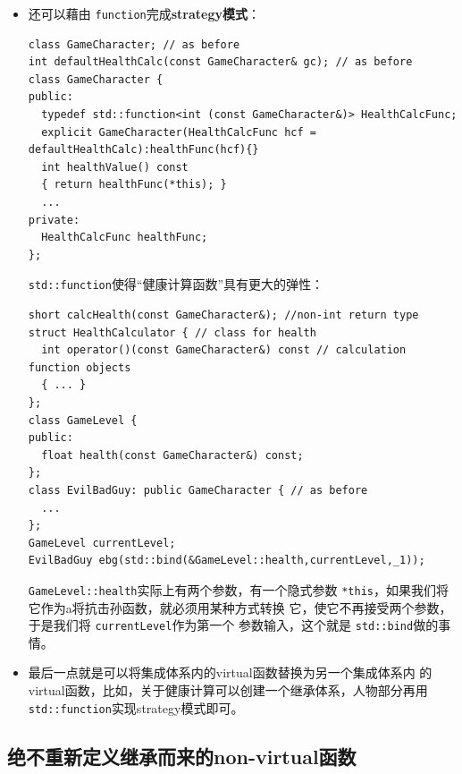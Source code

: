 \documentclass[a4paper,twoside]{article}
\theoremstyle{definition}
\theoremstyle{remark}
\numberwithin{equation}{section}
\let\OldTexttt\texttt
\renewcommand{\texttt}[1]{{\color{blue} \OldTexttt{#1}}}
\begin{document}
\begin{itemize}
\item 还可以藉由\texttt{function}完成\textbf{strategy模式}：
\begin{verbatim}
class GameCharacter; // as before
int defaultHealthCalc(const GameCharacter& gc); // as before
class GameCharacter {
public:
  typedef std::function<int (const GameCharacter&)> HealthCalcFunc;
  explicit GameCharacter(HealthCalcFunc hcf = defaultHealthCalc):healthFunc(hcf){}
  int healthValue() const
  { return healthFunc(*this); }
  ...
private:
  HealthCalcFunc healthFunc;
};
\end{verbatim}
  \texttt{std::function}使得“健康计算函数”具有更大的弹性：
\begin{verbatim}
short calcHealth(const GameCharacter&); //non-int return type
struct HealthCalculator { // class for health
  int operator()(const GameCharacter&) const // calculation function objects
  { ... }
};
class GameLevel {
public:
  float health(const GameCharacter&) const;
}; 
class EvilBadGuy: public GameCharacter { // as before
  ...
};
GameLevel currentLevel;
EvilBadGuy ebg(std::bind(&GameLevel::health,currentLevel,_1));
\end{verbatim}
  \texttt{GameLevel::health}实际上有两个参数，有一个隐式参数
  \texttt{*this}，如果我们将它作为a将抗击孙函数，就必须用某种方式转换
  它，使它不再接受两个参数，于是我们将\texttt{currentLevel}作为第一个
  参数输入，这个就是\texttt{std::bind}做的事情。
\item 最后一点就是可以将集成体系内的virtual函数替换为另一个集成体系内
  的virtual函数，比如，关于健康计算可以创建一个继承体系，人物部分再用
  \texttt{std::function}实现strategy模式即可。
\end{itemize}

\subsection{绝不重新定义继承而来的non-virtual函数}
\label{sec:Item-36}



\end{document}
